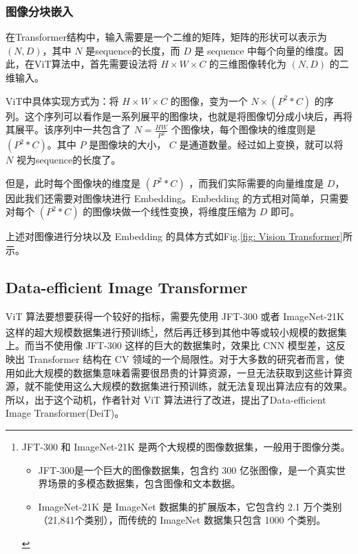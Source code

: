 \documentclass[letterpaper,10pt]{article}
\begin{document}
	\subsubsection{图像分块嵌入}
	
	在Transformer结构中，输入需要是一个二维的矩阵，矩阵的形状可以表示为$(N,D)$，其中 $N$ 是sequence的长度，而 $D$ 是 sequence 中每个向量的维度。因此，在ViT算法中，首先需要设法将 $H \times W \times C$ 的三维图像转化为 $\left( N,D \right)$ 的二维输入。
	
	ViT中具体实现方式为：将 $H \times W \times C$ 的图像，变为一个 $N \times \left( P^2 * C \right)$ 的序列。这个序列可以看作是一系列展平的图像块，也就是将图像切分成小块后，再将其展平。该序列中一共包含了 $N = \frac{HW}{P^2}$ 个图像块，每个图像块的维度则是 $\left(P^2 * C\right)$。其中 $P$ 是图像块的大小， $C$ 是通道数量。经过如上变换，就可以将 $N$ 视为sequence的长度了。

	但是，此时每个图像块的维度是 $\left(P^2 * C\right)$ ，而我们实际需要的向量维度是 $D$，因此我们还需要对图像块进行 Embedding。Embedding 的方式相对简单，只需要对每个 $\left(P^2 * C\right)$ 的图像块做一个线性变换，将维度压缩为 $D$ 即可。
	
	上述对图像进行分块以及 Embedding 的具体方式如Fig.\ref{fig: Vision Transformer}所示。
	
	\subsection{Data-efficient Image Transformer\cite{touvron2021training}}
	
	ViT 算法要想要获得一个较好的指标，需要先使用 JFT-300 或者 ImageNet-21K 这样的超大规模数据集进行预训练\footnote{JFT-300 和 ImageNet-21K 是两个大规模的图像数据集，一般用于图像分类。
	\begin{itemize}
		\item {}
		JFT-300是一个巨大的图像数据集，包含约 300 亿张图像，是一个真实世界场景的多模态数据集，包含图像和文本数据。
		\item {}
		ImageNet-21K 是 ImageNet 数据集的扩展版本，它包含约 2.1 万个类别（21,841个类别），而传统的 ImageNet 数据集只包含 1000 个类别。
	\end{itemize}
	}，然后再迁移到其他中等或较小规模的数据集上。而当不使用像 JFT-300 这样的巨大的数据集时，效果比 CNN 模型差，这反映出 Transformer 结构在 CV 领域的一个局限性。对于大多数的研究者而言，使用如此大规模的数据集意味着需要很昂贵的计算资源，一旦无法获取到这些计算资源，就不能使用这么大规模的数据集进行预训练，就无法复现出算法应有的效果。所以，出于这个动机，作者针对 ViT 算法进行了改进，提出了Data-efficient Image Transformer(DeiT)。
	
\end{document}
